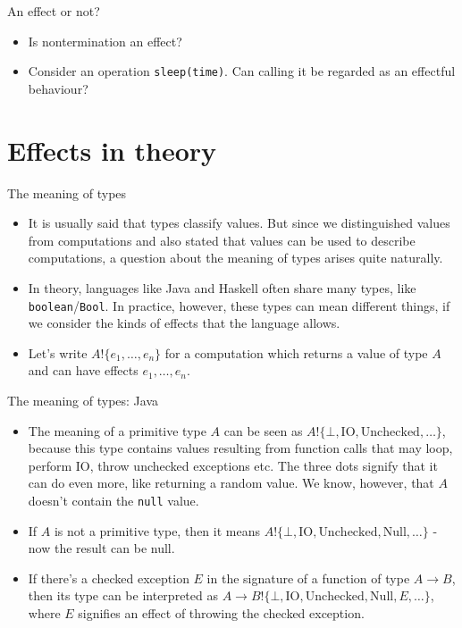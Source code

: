 \documentclass{beamer}
\newcommand{\eff}[2]{#1 ! \{ #2 \}}
\begin{document}
\begin{frame}{An effect or not?}
\begin{itemize}
	\item Is nontermination an effect?
	\item Consider an operation \texttt{sleep(time)}. Can calling it be regarded as an effectful behaviour?
\end{itemize}
\end{frame}

\section{Effects in theory}

\begin{frame}{The meaning of types}
\begin{itemize}
	\item It is usually said that types classify values. But since we distinguished values from computations and also stated that values can be used to describe computations, a question about the meaning of types arises quite naturally.
	\item In theory, languages like Java and Haskell often share many types, like \texttt{boolean}/\texttt{Bool}. In practice, however, these types can mean different things, if we consider the kinds of effects that the language allows.
	\item Let's write $\eff{A}{e_1, \dots, e_n}$ for a computation which returns a value of type $A$ and can have effects $e_1, \dots, e_n$.
\end{itemize}
\end{frame}

\begin{frame}{The meaning of types: Java}
\begin{itemize}
	\item The meaning of a primitive type $A$ can be seen as $\eff{A}{\bot, \text{IO}, \text{Unchecked}, \dots}$, because this type contains values resulting from function calls that may loop, perform IO, throw unchecked exceptions etc. The three dots signify that it can do even more, like returning a random value. We know, however, that $A$ doesn't contain the \texttt{null} value.
	\item If $A$ is not a primitive type, then it means $\eff{A}{\bot, \text{IO}, \text{Unchecked}, \text{Null}, \dots}$ - now the result can be null.
	\item If there's a checked exception $E$ in the signature of a function of type $A \to B$, then its type can be interpreted as $A \to \eff{B}{\bot, \text{IO}, \text{Unchecked}, \text{Null}, E, \dots}$, where $E$ signifies an effect of throwing the checked exception.
\end{itemize}
\end{frame}
\end{document}
